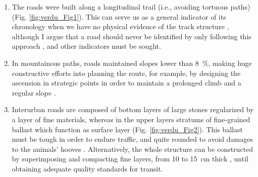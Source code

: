 	\begin{enumerate}
		\item The roads were built along a longitudinal trail (i.e., avoiding tortuous paths) (Fig. \ref{fig:verdu_Fig1}). This can serve us as a general indicator of its chronology when we have no physical evidence of the track structure \parencites[362--363]{Arasa_2008}[415]{Sillières_1990}, although I argue that a road should never be identified by only following this approach \parencite[14]{Abásolo_1990}, and other indicators must be sought.
		\item In mountainous paths, roads maintained slopes lower than \SI{8}{\percent}, making huge constructive efforts into planning the route, for example, by designing the ascension in strategic points in order to maintain a prolonged climb and a regular slope \parencites[15]{Abásolo_1990}[21--22]{Moreno_2009}.
		\item Interurban roads \parencite[417]{Sillières_1990} are composed of bottom layers of large stones regularized by a layer of fine materials, whereas in the upper layers stratums of fine-grained ballast which function as surface layer (Fig. \ref{fig:verdu_Fig2}). This ballast must be tough in order to endure traffic, and quite rounded to avoid damages to the animals’ hooves \parencite[28]{Moreno_2009}. Alternatively, the whole structure can be constructed by superimposing and compacting fine layers, from \num{10} to \SI{15}{\centi\meter} thick \parencite[23]{Moreno_2009}, until obtaining adequate quality standards for transit. 
	\end{enumerate}
	
